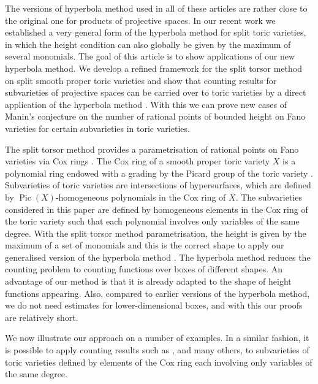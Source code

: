 \documentclass[10pt, a4paper, reqno, english]{amsart}
\DeclareMathOperator{\pic}{Pic} %
\theoremstyle{definition}
\numberwithin{theorem}{section}
\numberwithin{equation}{section}
\begin{document}
	The versions of hyperbola method used in all of these articles are rather close to the original one \cite{BB} 
	for products of projective spaces. In our recent work \cite{hypmethod} we established a very general form 
	of the hyperbola method for split toric varieties, in which the height condition can also globally be given by 
	the maximum of several monomials. The goal of this article is to show applications of our new hyperbola method. 
	We develop a refined framework for the split torsor method on split smooth proper toric varieties and show 
	that counting results for subvarieties of projective spaces can be carried over to toric varieties 
	by a direct application of the hyperbola method \cite{hypmethod}. With this we can prove new cases of 
	Manin's conjecture \cite{MR0974910, MR1032922} on the number of rational points of bounded height 
	on Fano varieties for certain subvarieties in toric varieties.\par
	
	The split torsor method provides a parametrisation of rational points on Fano varieties via 
	Cox rings \cite{MR1679841, MR4177266}. The Cox ring of a smooth proper toric variety $X$ 
	is a polynomial ring endowed with a grading by the Picard group of the toric variety \cite{MR1299003}. 
	Subvarieties of toric varieties are intersections of hypersurfaces, which are defined by $\pic(X)$-homogeneous 
	polynomials in the Cox ring of $X$. The subvarieties considered in this paper are defined by homogeneous elements 
	in the Cox ring of the toric variety such that each polynomial involves only variables of the same degree. 
	With the split torsor method parametrisation, the height is given by the maximum of a set of monomials and 
	this is the correct shape to apply our generalised version of the hyperbola method \cite{hypmethod}. 
	The hyperbola method reduces the counting problem to counting functions over boxes of different shapes. 
	An advantage of our method is that it is already adapted to the shape of height functions appearing. 
	Also, compared to earlier versions of the hyperbola method, we do not need estimates for lower-dimensional 
	boxes, and with this our proofs are relatively short.\par
	
	We now illustrate our approach on a number of examples. In a similar fashion, it is possible to apply 
	counting results such as \cite{birch61, HBdeltamethod, Myerson1, Myerson2, BHBdiffering}, 
	and many others, to subvarieties of toric varieties defined by elements of the Cox ring each involving 
	only variables of the same degree.
\end{document}
